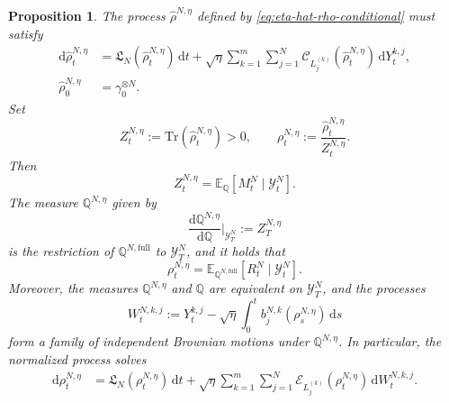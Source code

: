\documentclass[10pt,a4paper,reqno]{amsart}
\numberwithin{equation}{section}
\theoremstyle{plain}
\newtheorem{proposition}[theorem]{Proposition}
\theoremstyle{definition}
\theoremstyle{remark}
\renewcommand{\d}{\mathrm d}
\newcommand{\Tr}{\mathrm{Tr}}
\newcommand{\E}{\mathbb E}
\newcommand{\Q}{\mathbb Q}
\newcommand{\cC}{\mathcal C}
\newcommand{\cE}{\mathcal E}
\newcommand{\cY}{\mathcal Y}
\newcommand{\1}{\mathbf 1}
\begin{document}
\begin{proposition}
\label{prop:eta-conditional-reduction}
The process \(\widehat\rho^{N,\eta}\) defined by  \eqref{eq:eta-hat-rho-conditional} must satisfy
\begin{equation}
\begin{aligned}
  \d\widehat\rho_t^{N,\eta}
  &=
  \mathfrak L_N(\widehat\rho_t^{N,\eta})\,\d t+
  \sqrt{\eta}
  \sum_{k=1}^m\sum_{j=1}^N
  \cC_{L_j^{(k)}}(\widehat\rho_t^{N,\eta})\,\d Y_t^{k,j},
  \\
  \widehat\rho_0^{N,\eta}
  &=
  \gamma_0^{\otimes N}.
\end{aligned}
  \label{eq:eta-one-channel-linear}
\end{equation}
Set
\begin{equation}
  Z_t^{N,\eta}
  :=
  \Tr(\widehat\rho_t^{N,\eta})>0,
  \qquad
  \rho_t^{N,\eta}
  :=
  \frac{\widehat\rho_t^{N,\eta}}{Z_t^{N,\eta}}.
  \label{eq:eta-Z-rho-def}
\end{equation}
Then
\begin{equation}
  Z_t^{N,\eta}
  =
  \E_{\Q}
  \left[
    M_t^N\mid\cY_t^N
  \right].
  \label{eq:eta-Z-as-conditional-M}
\end{equation}
The measure $\Q^{N,\eta}$ given by
\begin{equation}
  \frac{\d\Q^{N,\eta}}{\d\Q}
  \bigg|_{\cY_T^N}
  :=
  Z_T^{N,\eta}
  \label{eq:eta-Qeta-def}
\end{equation}
is the restriction of \(\Q^{N,\mathrm{full}}\) to \(\cY_T^N\), and it holds that
\begin{equation}
  \rho_t^{N,\eta}
  =
  \E_{\Q^{N,\mathrm{full}}}
  \left[
    R_t^N\mid\cY_t^N
  \right].
  \label{eq:eta-normalized-conditional}
\end{equation}
Moreover,  the measures \(\Q^{N,\eta}\) and
\(\Q\) are equivalent on \(\cY_T^N\), and the processes
\begin{equation}
  W_t^{N,k,j}
  :=
  Y_t^{k,j}
  -
  \sqrt{\eta}
  \int_0^t
  b_j^{N,k}(\rho_s^{N,\eta})\,\d s
  \label{eq:eta-WN-def}
\end{equation}
form a family of  independent Brownian motions under \(\Q^{N,\eta}\).  In particular,  
the normalized process solves
\begin{equation}
\begin{aligned}
  \d\rho_t^{N,\eta}
  &=
  \mathfrak L_N(\rho_t^{N,\eta})\,\d t+
  \sqrt{\eta}
  \sum_{k=1}^m\sum_{j=1}^N
  \cE_{L_j^{(k)}}(\rho_t^{N,\eta})\,\d W_t^{N,k,j}.
\end{aligned}
  \label{eq:eta-N-target}
\end{equation}
\end{proposition}
\end{document}
